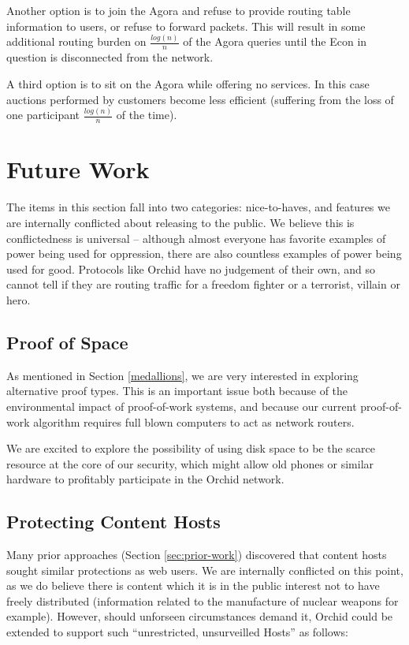 \documentclass{article}
\newcommand{\orchid}{Orchid}
\newcommand{\Orchid}{\orchid}
\begin{document}
Another option is to join the Agora and refuse to provide routing
table information to users, or refuse to forward packets. This will
result in some additional routing burden on $\frac{log(n)}{n}$ of the
Agora queries until the Econ in question is disconnected from the
network.

A third option is to sit on the Agora while offering no services. In
this case auctions performed by customers become less efficient
(suffering from the loss of one participant $\frac{log(n)}{n}$ of the
time).

\section{Future Work}
\label{sec:future}

The items in this section fall into two categories: nice-to-haves, and features we are internally conflicted about releasing to the public. We believe this is conflictedness is universal -- although almost everyone has favorite examples of power being used for oppression, there are also countless examples of power being used for good. Protocols like \Orchid{} have no judgement of their own, and so cannot tell if they are routing traffic for a freedom fighter or a terrorist, villain or hero.

\subsection{Proof of Space}
\label{future:proof-of-space}

As mentioned in Section \ref{medallions}, we are very interested in
exploring alternative proof types. This is an important issue both
because of the environmental impact of proof-of-work systems, and
because our current proof-of-work algorithm requires full blown
computers to act as network routers.

We are excited to explore the possibility of using disk space to be
the scarce resource at the core of our security, which might allow old
phones or similar hardware to profitably participate in the \Orchid{}
network.

\subsection{Protecting Content Hosts}
\label{subsec:protocol-extentions}

Many prior approaches (Section \ref{sec:prior-work}) discovered that content hosts sought similar protections as web users. We are internally conflicted on this point, as we do believe there is content which it is in the public interest not to have freely distributed (information related to the manufacture of nuclear weapons for example). However, should unforseen circumstances demand it, \Orchid{} could be extended to support such ``unrestricted, unsurveilled Hosts'' as follows:
\end{document}
